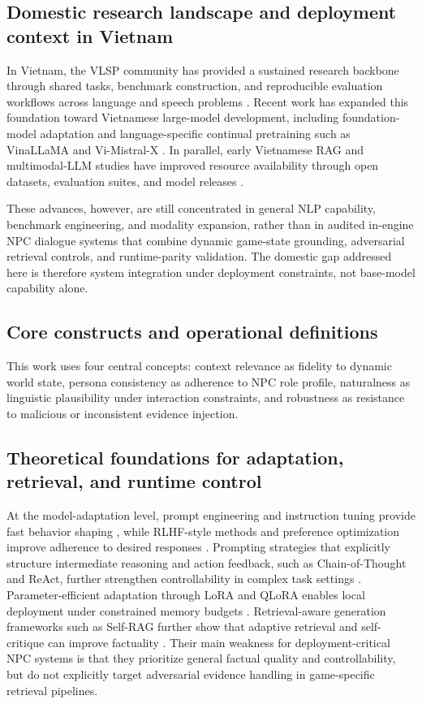 ﻿\documentclass[a4paper,12pt]{article}
\begin{document}
\subsection{Domestic research landscape and deployment context in Vietnam}
In Vietnam, the VLSP community has provided a sustained research backbone through shared tasks, benchmark construction, and reproducible evaluation workflows across language and speech problems \cite{VLSP2025Proceedings,Ha2025VLSPSemanticParsing}. Recent work has expanded this foundation toward Vietnamese large-model development, including foundation-model adaptation and language-specific continual pretraining such as VinaLLaMA and Vi-Mistral-X \cite{VinaLLaMA2023,ViMistralX2024}. In parallel, early Vietnamese RAG and multimodal-LLM studies have improved resource availability through open datasets, evaluation suites, and model releases \cite{Duc2024VietnamRAG,LaVy2024}.

These advances, however, are still concentrated in general NLP capability, benchmark engineering, and modality expansion, rather than in audited in-engine NPC dialogue systems that combine dynamic game-state grounding, adversarial retrieval controls, and runtime-parity validation. The domestic gap addressed here is therefore system integration under deployment constraints, not base-model capability alone.

\subsection{Core constructs and operational definitions}
This work uses four central concepts: context relevance as fidelity to dynamic world state, persona consistency as adherence to NPC role profile, naturalness as linguistic plausibility under interaction constraints, and robustness as resistance to malicious or inconsistent evidence injection.

\subsection{Theoretical foundations for adaptation, retrieval, and runtime control}
At the model-adaptation level, prompt engineering and instruction tuning provide fast behavior shaping \cite{Liu2021PromptSurvey}, while RLHF-style methods and preference optimization improve adherence to desired responses \cite{Ouyang2022InstructGPT,Rafailov2023DPO}. Prompting strategies that explicitly structure intermediate reasoning and action feedback, such as Chain-of-Thought and ReAct, further strengthen controllability in complex task settings \cite{Wei2022CoT,Yao2023ReAct}. Parameter-efficient adaptation through LoRA and QLoRA enables local deployment under constrained memory budgets \cite{Hu2021LoRA,Dettmers2023QLoRA}. Retrieval-aware generation frameworks such as Self-RAG further show that adaptive retrieval and self-critique can improve factuality \cite{Asai2024SelfRAG}. Their main weakness for deployment-critical NPC systems is that they prioritize general factual quality and controllability, but do not explicitly target adversarial evidence handling in game-specific retrieval pipelines.
\end{document}
